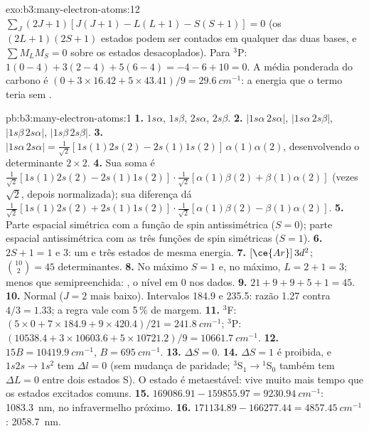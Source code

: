 \begin{solution}{exo:b3:many-electron-atoms:12}
$\sum_J(2J+1)[J(J+1) - L(L+1) - S(S+1)] = 0$ (os $(2L+1)(2S+1)$ estados podem
ser contados em qualquer das duas bases, e $\sum M_LM_S = 0$ sobre os estados desacoplados).
Para ${}^3$P: $1(0 - 4) + 3(2 - 4) + 5(6 - 4) = -4 - 6 + 10 = 0$. A média
ponderada do carbono é $(0 + 3 \times 16.42 + 5 \times 43.41)/9 = \qty{29.6}{cm^{-1}}$:
a energia que o termo teria sem .
\end{solution}

\begin{solution}{pb:b3:many-electron-atoms:1}
\textbf{1.} $1s\alpha$, $1s\beta$, $2s\alpha$, $2s\beta$.
\textbf{2.} $|1s\alpha\,2s\alpha|$, $|1s\alpha\,2s\beta|$, $|1s\beta\,2s\alpha|$,
$|1s\beta\,2s\beta|$.
\textbf{3.} $|1s\alpha\,2s\alpha| = \frac{1}{\sqrt2}[1s(1)2s(2) - 2s(1)1s(2)]\,
\alpha(1)\alpha(2)$, desenvolvendo o determinante $2\times2$.
\textbf{4.} Sua soma é $\frac{1}{\sqrt2}[1s(1)2s(2) - 2s(1)1s(2)]\cdot
\frac{1}{\sqrt2}[\alpha(1)\beta(2) + \beta(1)\alpha(2)]$ (vezes $\sqrt2$, depois
normalizada); sua diferença dá $\frac{1}{\sqrt2}[1s(1)2s(2) +
2s(1)1s(2)]\cdot\frac{1}{\sqrt2}[\alpha(1)\beta(2) - \beta(1)\alpha(2)]$.
\textbf{5.} Parte espacial simétrica com a função de spin antissimétrica ($S = 0$);
parte espacial antissimétrica com as três funções de spin simétricas ($S = 1$).
\textbf{6.} $2S + 1 = 1$ e 3: um e três estados de mesma energia.
\textbf{7.} $[\ce{Ar}]\,3d^2$; $\binom{10}{2} = 45$ determinantes.
\textbf{8.} No máximo $S = 1$ e, no máximo, $L = 2 + 1 = 3$; menos que semipreenchida:
, o nível em 0 nos dados.
\textbf{9.} $21 + 9 + 9 + 5 + 1 = 45$.
\textbf{10.} Normal ($J = 2$ mais baixo). Intervalos 184.9 e 235.5: razão 1.27
contra $4/3 = 1.33$; a regra vale com 5\,\% de margem.
\textbf{11.} ${}^3$F: $(5 \times 0 + 7 \times 184.9 + 9 \times 420.4)/21 =
\qty{241.8}{cm^{-1}}$; ${}^3$P: $(10538.4 + 3 \times 10603.6 + 5 \times
10721.2)/9 = \qty{10661.7}{cm^{-1}}$.
\textbf{12.} $15B = \qty{10419.9}{cm^{-1}}$, $B = \qty{695}{cm^{-1}}$.
\textbf{13.} $\Delta S = 0$.
\textbf{14.} $\Delta S = 1$ é proibida, e $1s2s \to 1s^2$ tem $\Delta l = 0$
(sem mudança de paridade; ${}^3$S$_1 \to {}^1$S$_0$ também tem $\Delta L = 0$ entre dois estados
S). O estado é metaestável: vive muito mais tempo que os estados excitados
comuns.
\textbf{15.} $169086.91 - 159855.97 = \qty{9230.94}{cm^{-1}}$: \qty{1083.3}{nm}, no
infravermelho próximo.
\textbf{16.} $171134.89 - 166277.44 = \qty{4857.45}{cm^{-1}}$: \qty{2058.7}{nm}.

\end{solution}
